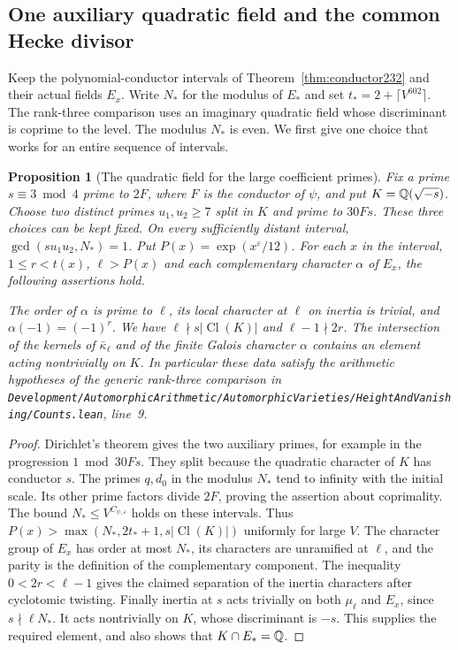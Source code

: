 \documentclass[a4paper,11pt]{article}
\newtheorem{proposition}{Proposition}[section]
\theoremstyle{definition}
\theoremstyle{remark}
\newcommand{\srcloc}[2]{{\small\nolinkurl{#1.lean}}, line~#2}
\numberwithin{equation}{section}
\newcommand{\Cl}{\operatorname{Cl}}
\begin{document}
\subsection{One auxiliary quadratic field and the common Hecke divisor}\label{sec:heckedivisor345}

Keep the polynomial-conductor intervals of
Theorem~\ref{thm:conductor232} and their actual fields $E_x$.
Write $N_*$ for the modulus of $E_*$ and set
$t_*=2+\lceil V^{602}\rceil$. The rank-three comparison uses an
imaginary quadratic field whose discriminant is coprime to the
level. The modulus $N_*$ is even. We first give one choice that
works for an entire sequence of intervals.

\begin{proposition}[The quadratic field for the large coefficient primes]\leavevmode\label{prop:quadratic345}
Fix a prime $s\equiv3\bmod4$ prime to $2F$, where $F$ is the
conductor of $\psi$, and put $K=\mathbb Q(\sqrt{-s})$. Choose two
distinct primes $u_1,u_2\ge7$ split in $K$ and prime to $30Fs$.
These three choices can be kept fixed. On every sufficiently
distant interval, $\gcd(su_1u_2,N_*)=1$. Put
$P(x)=\exp(x^\varepsilon/12)$. For each $x$ in the interval,
$1\le r<t(x)$, $\ell>P(x)$ and each complementary character
$\alpha$ of $E_x$, the following assertions hold.

The order of $\alpha$ is prime to $\ell$, its local character at
$\ell$ on inertia is trivial, and $\alpha(-1)=(-1)^r$.
We have $\ell\nmid s|\Cl(K)|$ and $\ell-1\nmid 2r$. The
intersection of the kernels of $\bar\kappa_\ell$ and of the
finite Galois character $\alpha$ contains an element acting
nontrivially on $K$. In particular these data satisfy the
arithmetic hypotheses of the generic rank-three comparison in
\srcloc{Development/AutomorphicArithmetic/AutomorphicVarieties/HeightAndVanishing/Counts}{9}.
\end{proposition}
\begin{proof}
Dirichlet's theorem gives the two auxiliary primes, for example in
the progression $1\bmod 30Fs$. They split because the quadratic
character of $K$ has conductor $s$. The primes $q,d_0$ in the
modulus $N_*$ tend to infinity with the initial scale. Its other
prime factors divide $2F$, proving the assertion about coprimality.
The bound $N_*\le V^{C_{\psi,\varepsilon}}$ holds on these intervals.
Thus $P(x)>\max(N_*,2t_*+1,s|\Cl(K)|)$ uniformly for large $V$.
The character group of $E_x$ has order at most $N_*$, its
characters are unramified at $\ell$, and the parity is the
definition of the complementary component. The inequality
$0<2r<\ell-1$ gives the claimed separation of the inertia
characters after cyclotomic twisting. Finally inertia at $s$
acts trivially on both $\mu_\ell$ and $E_x$, since
$s\nmid\ell N_*$. It acts nontrivially on $K$, whose
discriminant is $-s$. This supplies the required element,
and also shows that $K\cap E_*=\mathbb Q$.
\end{proof}
\end{document}
